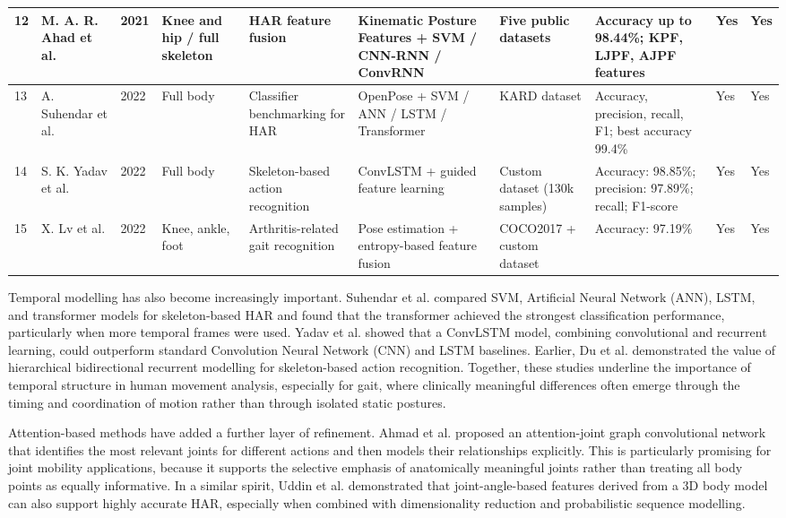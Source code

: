 \documentclass[12pt]{elsarticle}
\begin{document}
{\begin{longtable}{m{0.7cm} m{2.0cm} m{0.9cm} m{1.5cm} m{2.0cm} m{2.3cm} m{2.1cm} m{2.0cm} m{0.7cm} m{0.7cm}}
\hline
12 & M. A. R. Ahad et al. & 2021 & Knee and hip / full skeleton & HAR feature fusion & Kinematic Posture Features + SVM / CNN-RNN / ConvRNN & Five public datasets & Accuracy up to 98.44\%; KPF, LJPF, AJPF features & Yes & Yes \\
\hline
13 & A. Suhendar et al. & 2022 & Full body & Classifier benchmarking for HAR & OpenPose + SVM / ANN / LSTM / Transformer & KARD dataset & Accuracy, precision, recall, F1; best accuracy 99.4\% & Yes & Yes \\
\hline
14 & S. K. Yadav et al. & 2022 & Full body & Skeleton-based action recognition & ConvLSTM + guided feature learning & Custom dataset (130k samples) & Accuracy: 98.85\%; precision: 97.89\%; recall; F1-score & Yes & Yes \\
\hline
15 & X. Lv et al. & 2022 & Knee, ankle, foot & Arthritis-related gait recognition & Pose estimation + entropy-based feature fusion & COCO2017 + custom dataset & Accuracy: 97.19\% & Yes & Yes \\
\hline

\end{longtable}
}

Temporal modelling has also become increasingly important. Suhendar et al. \cite{suhendar2022skeletal} compared SVM, Artificial Neural Network (ANN), LSTM, and transformer models for skeleton-based HAR and found that the transformer achieved the strongest classification performance, particularly when more temporal frames were used. Yadav et al. \cite{yadav2022skeleton} showed that a ConvLSTM model, combining convolutional and recurrent learning, could outperform standard Convolution Neural Network (CNN) and LSTM baselines. Earlier, Du et al. \cite{du2015hierarchical} demonstrated the value of hierarchical bidirectional recurrent modelling for skeleton-based action recognition. Together, these studies underline the importance of temporal structure in human movement analysis, especially for gait, where clinically meaningful differences often emerge through the timing and coordination of motion rather than through isolated static postures.

Attention-based methods have added a further layer of refinement. Ahmad et al. \cite{ahmad2019action} proposed an attention-joint graph convolutional network that identifies the most relevant joints for different actions and then models their relationships explicitly. This is particularly promising for joint mobility applications, because it supports the selective emphasis of anatomically meaningful joints rather than treating all body points as equally informative. In a similar spirit, Uddin et al. \cite{uddin2011human} demonstrated that joint-angle-based features derived from a 3D body model can also support highly accurate HAR, especially when combined with dimensionality reduction and probabilistic sequence modelling.
\end{document}
